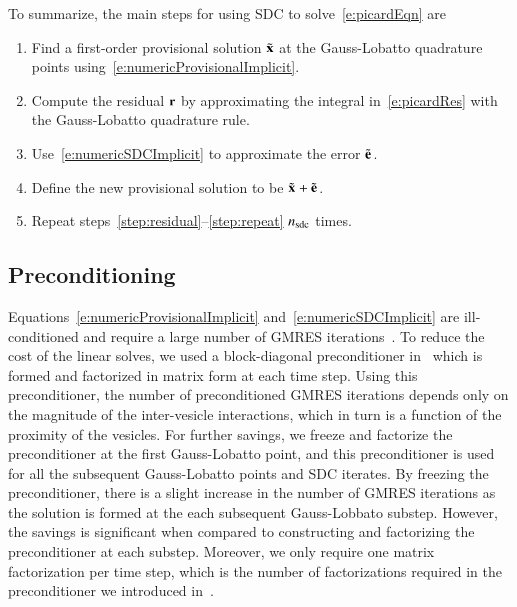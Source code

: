 To summarize, the main steps for using SDC to solve~\eqref{e:picardEqn}
are
\begin{enumerate}
  \item Find a first-order provisional solution $\tilde{{\mathbf{x}}}$ at the
  Gauss-Lobatto quadrature points
  using~\eqref{e:numericProvisionalImplicit}.

  \item \label{step:residual} Compute the residual ${\mathbf{r}}$ by
  approximating the integral in~\eqref{e:picardRes} with the
  Gauss-Lobatto quadrature rule.

  \item Use~\eqref{e:numericSDCImplicit} to approximate the error
  ${\tilde{{\mathbf{e}}}_{}}$.

  \item Define the new provisional solution to be ${\tilde{{\mathbf{x}}}_{}} + {\tilde{{\mathbf{e}}}_{}}$.

  \item \label{step:repeat} Repeat
  steps~\ref{step:residual}--\ref{step:repeat} $n_{{\mathrm{sdc}}}$ times.
\end{enumerate}



\subsection{Preconditioning}
\label{s:preco}
Equations~\eqref{e:numericProvisionalImplicit}
and~\eqref{e:numericSDCImplicit} are ill-conditioned and require a
large number of GMRES iterations~\cite{vee:gue:zor:bir2009}.  To reduce
the cost of the linear solves, we used a block-diagonal preconditioner
in~\cite{qua:bir2014b} which is formed and factorized in matrix form at
each time step.  Using this preconditioner, the number of
preconditioned GMRES iterations depends only on the magnitude of the
inter-vesicle interactions, which in turn is a function of the
proximity of the vesicles.  For further savings, we freeze and
factorize the preconditioner at the first Gauss-Lobatto point, and this
preconditioner is used for all the subsequent Gauss-Lobatto points and
SDC iterates.  By freezing the preconditioner, there is a slight
increase in the number of GMRES iterations as the solution is formed at
the each subsequent Gauss-Lobbato substep.  However, the savings is
significant when compared to constructing and factorizing the
preconditioner at each substep.  Moreover, we only require one matrix
factorization per time step, which is the number of factorizations
required in the preconditioner we introduced in~\cite{qua:bir2014b}.



